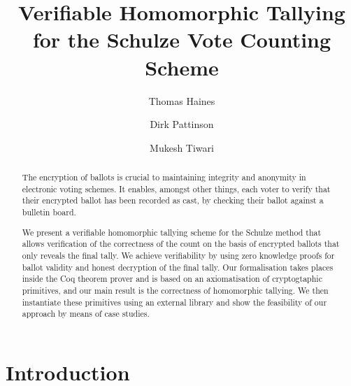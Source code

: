 \documentclass{llncs}
\begin{document}
\title{Verifiable Homomorphic Tallying for the Schulze Vote Counting
Scheme}

\author{Thomas Haines  \and
      Dirk Pattinson \and Mukesh Tiwari }
\maketitle

\begin{abstract}
The encryption of ballots is crucial to maintaining integrity and 
anonymity in electronic voting schemes. It enables, amongst other 
things, each voter to verify that their encrypted ballot has been 
recorded as cast, by checking their ballot against a bulletin board. 

We present a verifiable homomorphic tallying scheme for the Schulze 
method that allows verification of the correctness of the count on the 
basis of encrypted ballots that only reveals the final tally. We 
achieve verifiability by using zero knowledge proofs for ballot 
validity and honest decryption of the final tally. Our formalisation 
takes places inside the Coq theorem prover and is based on an 
axiomatisation of cryptogtaphic primitives, and our main result is 
the correctness of homomorphic tallying. We then instantiate 
these primitives using an external library and show the feasibility 
of our approach by means of case studies.
\end{abstract}


\section{Introduction}
\end{document}
